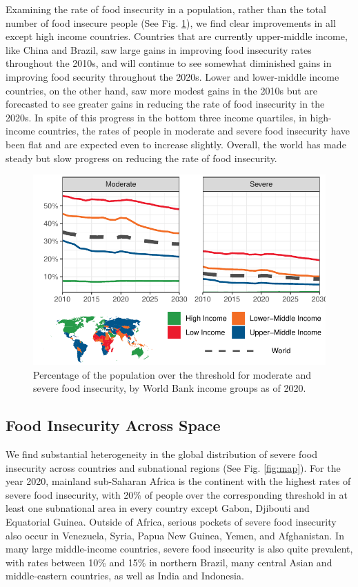 \documentclass{article}
\begin{document}
Examining the rate of food insecurity in a population, rather than the total number of food insecure people (See Fig. \ref{fig:rates}), we find clear improvements in all except high income countries.  Countries that are currently upper-middle income, like China and Brazil, saw large gains in improving food insecurity rates throughout the 2010s, and will continue to see somewhat diminished gains in improving food security throughout the 2020s.  Lower and lower-middle income countries, on the other hand, saw more modest gains in the 2010s but are forecasted to see greater gains in reducing the rate of food insecurity in the 2020s.  In spite of this progress in the bottom three income quartiles, in high-income countries, the rates of people in moderate and severe food insecurity have been flat and are expected even to increase slightly.  Overall, the world has made steady but slow progress on reducing the rate of food insecurity.

\begin{figure}[H]
  \centering
  \includegraphics[width=\linewidth]{img/Rates.pdf}
  \caption{Percentage of the population over the threshold for moderate and severe food insecurity, by World Bank income groups as of 2020.}
  \label{fig:rates}
\end{figure}


\subsection{Food Insecurity Across Space}
We find substantial heterogeneity in the global distribution of severe food insecurity across countries and subnational regions (See Fig. \ref{fig:map}).  For the year 2020, mainland sub-Saharan Africa is the continent with the highest rates of severe food insecurity, with 20\% of people over the corresponding threshold in at least one subnational area in every country except Gabon, Djibouti and Equatorial Guinea.  Outside of Africa, serious pockets of severe food insecurity also occur in Venezuela, Syria, Papua New Guinea, Yemen, and Afghanistan.  In many large middle-income countries, severe food insecurity is also quite prevalent, with rates between 10\% and 15\% in northern Brazil, many central Asian and middle-eastern countries, as well as India and Indonesia.
\end{document}
